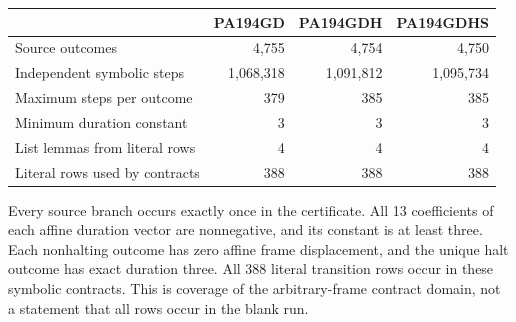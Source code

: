 \begin{center}
\begin{tabular}{lrrr}
\toprule
 & \textsf{PA194GD} & \textsf{PA194GDH} & \textsf{PA194GDHS}\\
\midrule
Source outcomes & 4,755 & 4,754 & 4,750\\
Independent symbolic steps & 1,068,318 & 1,091,812 & 1,095,734\\
Maximum steps per outcome & 379 & 385 & 385\\
Minimum duration constant & 3 & 3 & 3\\
List lemmas from literal rows & 4 & 4 & 4\\
Literal rows used by contracts & 388 & 388 & 388\\
\bottomrule
\end{tabular}
\end{center}

Every source branch occurs exactly once in the certificate. All 13 coefficients
of each affine duration vector are nonnegative, and its constant is at least
three. Each nonhalting outcome has zero affine frame displacement, and the
unique halt outcome has exact duration three. All 388 literal transition rows
occur in these symbolic contracts. This is coverage of the arbitrary-frame
contract domain, not a statement that all rows occur in the blank run.
